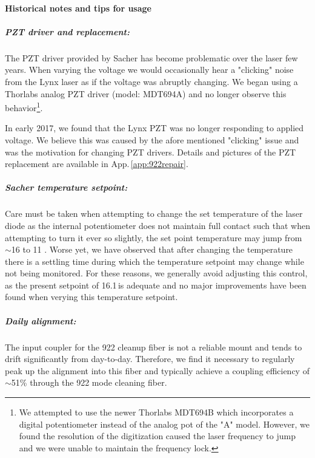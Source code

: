 \paragraph{Historical notes and tips for usage}
\subparagraph{PZT driver and replacement:}
The PZT driver provided by Sacher has become problematic over the laser few years.
When varying the voltage we would occasionally hear a "clicking" noise from the Lynx laser as if the voltage was abruptly changing.
We began using a Thorlabs analog PZT driver (model: MDT694A) and no longer observe this behavior\footnote{We attempted to use the newer Thorlabs MDT694B which incorporates a digital potentiometer instead of the analog pot of the "A" model.
However, we found the resolution of the digitization caused the laser frequency to jump and we were unable to maintain the frequency lock.}.

In early 2017, we found that the Lynx PZT was no longer responding to applied voltage.
We believe this was caused by the afore mentioned "clicking" issue and was the motivation for changing PZT drivers.
Details and pictures of the PZT replacement are available in App.\,\ref{app:922repair}.

\subparagraph{Sacher temperature setpoint:}
Care must be taken when attempting to change the set temperature of the laser diode as the internal potentiometer does not maintain full contact such that when attempting to turn it ever so slightly, the set point temperature may jump from $\sim$16 \degreeC to 11 \degreeC.
Worse yet, we have observed that after changing the temperature there is a settling time during which the temperature setpoint may change while not being monitored.
For these reasons, we generally avoid adjusting this control, as the present setpoint of 16.1\,\degreeC is adequate and no major improvements have been found when verying this temperature setpoint.

\subparagraph{Daily alignment:}
The input coupler for the 922 cleanup fiber is not a reliable mount and tends to drift significantly from day-to-day.
Therefore, we find it necessary to regularly peak up the alignment into this fiber and typically achieve a coupling efficiency of $\sim$51\% through the 922 mode cleaning fiber.

		

